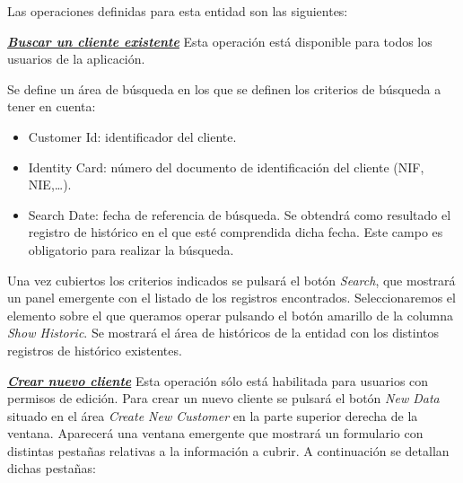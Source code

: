 Las operaciones definidas para esta entidad son las siguientes:


\underline{\textsl{\textbf{Buscar un cliente existente}}}\newline
Esta operación está disponible para todos los usuarios de la aplicación.

Se define un área de búsqueda en los que se definen los criterios de búsqueda a tener en cuenta:

\begin{itemize}
\item Customer Id: identificador del cliente.
\item Identity Card: número del documento de identificación del cliente (NIF, NIE,\dots).
\item Search Date: fecha de referencia de búsqueda. Se obtendrá como resultado el registro de histórico en el que esté comprendida dicha fecha. Este campo es obligatorio para realizar la búsqueda.
\end{itemize}

Una vez cubiertos los criterios indicados se pulsará el botón \emph{Search}, que mostrará un panel emergente con el listado de los registros encontrados. Seleccionaremos el elemento sobre el que queramos operar pulsando el botón amarillo de la columna \emph{Show Historic}. Se mostrará el área de históricos de la entidad con los distintos registros de histórico existentes.


\underline{\textsl{\textbf{Crear nuevo cliente}}}\newline
Esta operación sólo está habilitada para usuarios con permisos de edición.
Para crear un nuevo cliente se pulsará el botón \textit{New Data} situado en el área \emph{Create New Customer} en la parte superior derecha de la ventana. Aparecerá una ventana emergente que mostrará un formulario con distintas pestañas relativas a la información a cubrir. A continuación se detallan dichas pestañas:

